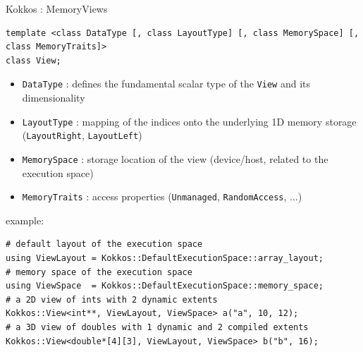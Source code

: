 \begin{frame}[fragile]{Kokkos : Memory}{Views}
  \begin{verbatim}
template <class DataType [, class LayoutType] [, class MemorySpace] [, class MemoryTraits]>
class View;
  \end{verbatim}
  \begin{itemize}
    \item \verb|DataType| : defines the fundamental scalar type of the \verb|View| and its dimensionality
    \item \verb|LayoutType| : mapping of the indices onto the underlying 1D memory storage (\verb|LayoutRight|, \verb|LayoutLeft|)
    \item \verb|MemorySpace| : storage location of the view (device/host, related to the execution space)
    \item \verb|MemoryTraits| : access properties (\verb|Unmanaged|, \verb|RandomAccess|, ...)
  \end{itemize}

  example:
  \begin{verbatim}
# default layout of the execution space
using ViewLayout = Kokkos::DefaultExecutionSpace::array_layout;
# memory space of the execution space
using ViewSpace  = Kokkos::DefaultExecutionSpace::memory_space;
# a 2D view of ints with 2 dynamic extents
Kokkos::View<int**, ViewLayout, ViewSpace> a("a", 10, 12);
# a 3D view of doubles with 1 dynamic and 2 compiled extents
Kokkos::View<double*[4][3], ViewLayout, ViewSpace> b("b", 16);
  \end{verbatim}
\end{frame}

